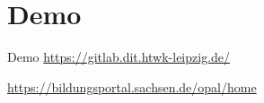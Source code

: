 
\section{Demo}

\begin{frame}{Demo}
    \url{https://gitlab.dit.htwk-leipzig.de/}
    
    \url{https://bildungsportal.sachsen.de/opal/home}
\end{frame}
